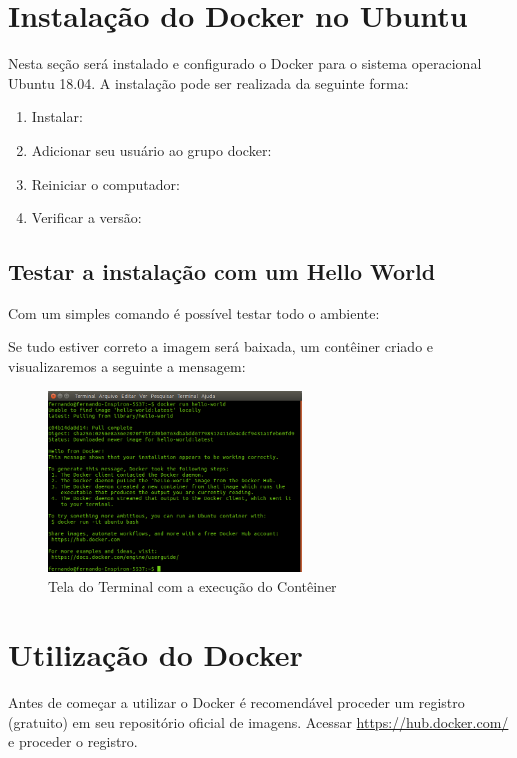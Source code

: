 \documentclass[a4paper,11pt]{article}
\begin{document}
\section{Instalação do Docker no Ubuntu}
Nesta seção será instalado e configurado o Docker para o sistema operacional Ubuntu 18.04. A instalação pode ser realizada da seguinte forma: \vspace{-1em}
\begin{enumerate}
  \item Instalar: 
  \item Adicionar seu usuário ao grupo docker: 
  \item Reiniciar o computador: 
  \item Verificar a versão: 
\end{enumerate}

\subsection{Testar a instalação com um Hello World}
Com um simples comando é possível testar todo o ambiente: \\

Se tudo estiver correto a imagem será baixada, um contêiner criado e visualizaremos a seguinte a mensagem:
\begin{figure}[H]
	\centering
	\includegraphics[width=0.6\textwidth]{imagem/hello.png}
	\caption{Tela do Terminal com a execução do Contêiner}
\end{figure}

\section{Utilização do Docker}
Antes de começar a utilizar o Docker é recomendável proceder um registro (gratuito) em seu repositório oficial de imagens. Acessar \url{https://hub.docker.com/} e proceder o registro.
\end{document}
